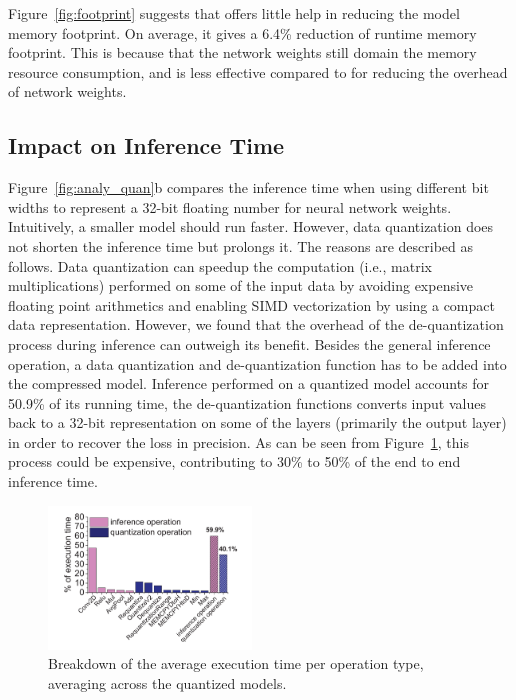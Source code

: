 Figure~\ref{fig:footprint} suggests that  \pruning offers little help in reducing the model memory footprint. On average, it gives a 6.4\%
reduction of runtime memory footprint. This is because that the network weights still domain the memory resource consumption, and \pruning
is less effective compared to \dquantization for reducing the overhead of network weights.



\subsection{Impact on Inference Time\label{sec:time}}
 Figure~\ref{fig:analy_quan}b compares the inference time when using different bit
widths to represent a 32-bit floating number for neural network weights. Intuitively, a smaller model should run faster. However, data
quantization does not shorten the inference time but prolongs it. The reasons are described as follows. Data quantization can speedup the
computation (i.e., matrix multiplications) performed on some of the input data by avoiding expensive floating point arithmetics and
enabling SIMD vectorization by using a compact data representation. However, we found that the overhead of the de-quantization process
during inference can outweigh its benefit. Besides the general inference operation, a data quantization and de-quantization function has to
be added into the compressed model. Inference performed on a quantized model accounts for 50.9\% of its running time, the de-quantization
functions converts input values back to a 32-bit representation on some of the layers (primarily the output layer) in order to recover the
loss in precision. As can be seen from Figure~\ref{fig:breakdown}, this process could be expensive, contributing to 30\% to 50\% of the end
to end inference time.

\begin{figure}
\begin{center}
\includegraphics[width=0.48\textwidth]{figure/breakdown4.pdf}
\end{center}
\caption{Breakdown of the average execution time per operation type, averaging across the quantized models.}
\vspace{-2mm}
\label{fig:breakdown}
\end{figure}


